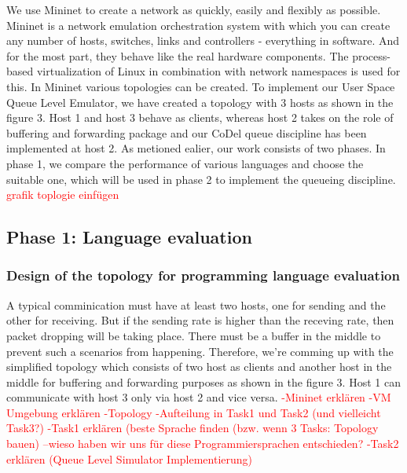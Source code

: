 We use Mininet to create a network as quickly, easily and flexibly as possible. Mininet is a network emulation orchestration system with which you can create any number of hosts, switches, links and controllers - everything in software. And for the most part, they behave like the real hardware components. The process-based virtualization of Linux in combination with network namespaces is used for this. \newline
In Mininet various topologies can be created. To implement our User Space Queue Level Emulator, we have created a topology with 3 hosts as shown in the figure 3. Host 1 and host 3 behave as clients, whereas host 2 takes on the role of buffering and forwarding package and our CoDel queue discipline has been implemented at host 2. As metioned ealier, our work consists of two phases. In phase 1, we compare the performance of various languages and choose the suitable one, which will be used in phase 2 to implement the queueing discipline. 
\textcolor{red}{grafik toplogie einfügen}

\subsection{Phase 1: Language evaluation}
\subsubsection{Design of the topology for programming language evaluation}
A typical comminication must have at least two hosts, one for sending and the other for receiving. But if the sending rate is higher than the receving rate, then packet dropping will be taking place. There must be a buffer in the middle to prevent such a scenarios from happening. Therefore, we're comming up with the simplified topology which consists of two host as clients and another host in the middle for buffering and forwarding purposes as shown in the figure 3. Host 1 can communicate with host 3 only via host 2 and vice versa.
\textcolor{red}{-Mininet erklären
-VM Umgebung erklären
-Topology
-Aufteilung in Task1 und Task2 (und vielleicht Task3?)
-Task1 erklären (beste Sprache finden (bzw. wenn 3 Tasks: Topology bauen)
--wieso haben wir uns für diese Programmiersprachen entschieden?
-Task2 erklären (Queue Level Simulator Implementierung)}

